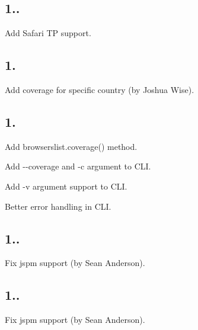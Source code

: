 \subsection*{1..}


\begin{DoxyItemize}
\item Add Safari TP support.
\end{DoxyItemize}

\subsection*{1.}


\begin{DoxyItemize}
\item Add coverage for specific country (by Joshua Wise).
\end{DoxyItemize}

\subsection*{1.}


\begin{DoxyItemize}
\item Add {\ttfamily browserslist.\+coverage()} method.
\item Add {\ttfamily -\/-\/coverage} and {\ttfamily -\/c} argument to C\+LI.
\item Add {\ttfamily -\/v} argument support to C\+LI.
\item Better error handling in C\+LI.
\end{DoxyItemize}

\subsection*{1..}


\begin{DoxyItemize}
\item Fix jspm support (by Sean Anderson).
\end{DoxyItemize}

\subsection*{1..}


\begin{DoxyItemize}
\item Fix jspm support (by Sean Anderson).
\end{DoxyItemize}

